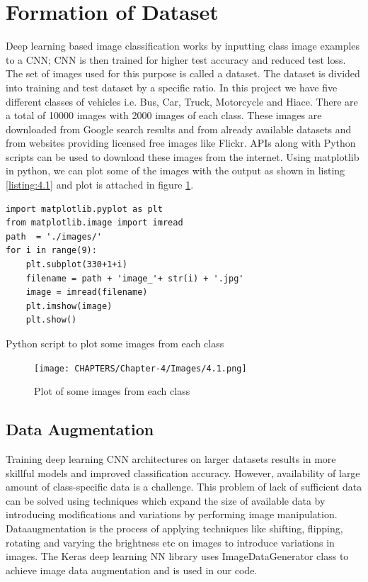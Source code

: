 \section{Formation of Dataset}
Deep learning based image classification works by inputting class
image examples to a CNN; CNN is then trained for higher test accuracy
and reduced test loss. The set of images used for this purpose is
called a dataset.
The dataset is divided into training and test dataset by a specific ratio.
In this project we have five different classes of vehicles i.e. Bus, Car, Truck, Motorcycle
and Hiace. There are a total of 10000 images with 2000 images of each 
class. These images are downloaded from Google search results and from already available
datasets and from websites providing licensed free images like Flickr.
APIs along with Python
scripts can be used to download these images from the internet.
Using matplotlib in python, we can plot some of the images with the output as
shown in listing \ref{listing:4.1} and plot is attached in figure
\ref{fig:4.1}.
\linespread{1.0}
\begin{listing}[H]
\begin{verbatim}
import matplotlib.pyplot as plt
from matplotlib.image import imread  
path  = './images/'
for i in range(9):
    plt.subplot(330+1+i)
    filename = path + 'image_'+ str(i) + '.jpg'
    image = imread(filename)
    plt.imshow(image)    
    plt.show()
\end{verbatim}
\caption{Python script to plot some images from each class}
\label{listing:4.1}
\end{listing}

\begin{figure}[H]
    \centering
    \captionsetup{justification = centering}
    \texttt{[image: CHAPTERS/Chapter-4/Images/4.1.png]}
    \caption{Plot of some images from each class} 
    \label{fig:4.1}
  \end{figure}

\subsection{Data Augmentation}
Training deep learning CNN architectures on larger datasets
results in more skillful models and improved classification accuracy.
However, availability of large amount of  class-specific data is a challenge.
This problem of lack of sufficient data can be solved using
techniques which expand the size of available data by introducing
modifications and variations by performing image manipulation.
Dataaugmentation is the process of applying techniques like shifting, 
flipping, rotating and varying the brightness etc on images to
introduce variations in images. The Keras deep learning NN library uses
ImageDataGenerator
class to achieve image data augmentation and is used in our code.

